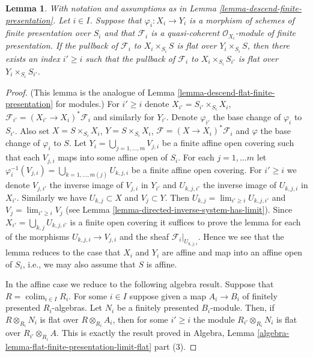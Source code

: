 \documentclass{stacks-project}
\theoremstyle{plain}
\newtheorem{lemma}[subsection]{Lemma}
\theoremstyle{definition}
\theoremstyle{remark}
\numberwithin{equation}{subsection}
\def\lim{\mathop{\mathrm{lim}}\nolimits}
\def\colim{\mathop{\mathrm{colim}}\nolimits}
\begin{document}
\begin{lemma}
\label{lemma-descend-module-flat-finite-presentation}
With notation and assumptions as in
Lemma \ref{lemma-descend-finite-presentation}.
Let $i \in I$.
Suppose that $\varphi_i : X_i \to Y_i$ is a morphism of schemes
of finite presentation over $S_i$ and that $\mathcal{F}_i$ is a
quasi-coherent $\mathcal{O}_{X_i}$-module of finite presentation.
If the pullback of $\mathcal{F}_i$ to $X_i \times_{S_i} S$ is flat
over $Y_i \times_{S_i} S$, then there exists an index $i' \geq i$
such that the pullback of $\mathcal{F}_i$ to $X_i \times_{S_i} S_{i'}$
is flat over $Y_i \times_{S_i} S_{i'}$.
\end{lemma}

\begin{proof}
(This lemma is the analogue of
Lemma \ref{lemma-descend-flat-finite-presentation}
for modules.)
For $i' \geq i$ denote $X_{i'} = S_{i'} \times_{S_i} X_i$,
$\mathcal{F}_{i'} = (X_{i'} \to X_i)^*\mathcal{F}_i$ and similarly
for $Y_{i'}$. Denote $\varphi_{i'}$ the base change
of $\varphi_i$ to $S_{i'}$. Also set $X = S \times_{S_i} X_i$,
$Y =S \times_{S_i} X_i$, $\mathcal{F} = (X \to X_i)^*\mathcal{F}_i$
and $\varphi$ the base change of $\varphi_i$ to $S$.
Let $Y_i = \bigcup_{j = 1, \ldots, m} V_{j, i}$ be a finite affine open
covering such that each $V_{j, i}$ maps into some affine open of $S_i$.
For each $j = 1, \ldots m$ let
$\varphi_i^{-1}(V_{j, i}) = \bigcup_{k = 1, \ldots, m(j)} U_{k, j, i}$
be a finite affine open covering. For $i' \geq i$ we denote
$V_{j, i'}$ the inverse image of $V_{j, i}$ in $Y_{i'}$ and
$U_{k, j, i'}$ the inverse image of $U_{k, j, i}$ in $X_{i'}$.
Similarly we have $U_{k, j} \subset X$ and $V_j \subset Y$.
Then $U_{k, j} = \lim_{i' \geq i} U_{k, j, i'}$
and $V_j = \lim_{i' \geq i} V_j$
(see Lemma \ref{lemma-directed-inverse-system-has-limit}).
Since $X_{i'} = \bigcup_{k, j} U_{k, j, i'}$ is a finite open covering
it suffices to prove the lemma for each of the morphisms
$U_{k, j, i} \to V_{j, i}$ and the sheaf $\mathcal{F}_i|_{U_{k, j, i}}$.
Hence we see that the lemma reduces to the case that $X_i$ and
$Y_i$ are affine and map into an affine open of $S_i$, i.e., we
may also assume that $S$ is affine.

\medskip\noindent
In the affine case we reduce to the following algebra result.
Suppose that $R = \colim_{i \in I} R_i$. For some $i \in I$
suppose given a map $A_i \to B_i$ of finitely presented $R_i$-algebras.
Let $N_i$ be a finitely presented $B_i$-module.
Then, if $R \otimes_{R_i} N_i$ is flat over $R \otimes_{R_i} A_i$,
then for some $i' \geq i$ the module
$R_{i'} \otimes_{R_i} N_i$ is flat over $R_{i'} \otimes_{R_i} A$.
This is exactly the result proved in
Algebra,
Lemma \ref{algebra-lemma-flat-finite-presentation-limit-flat} part (3).
\end{proof}
\end{document}
